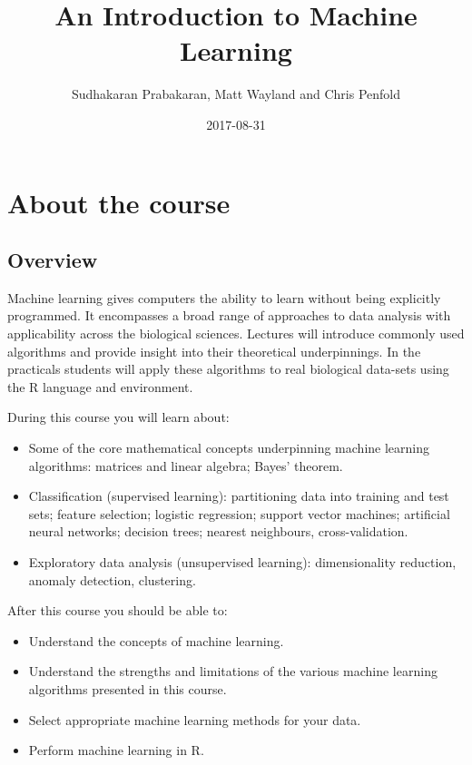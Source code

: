 \documentclass[]{book}
\title{An Introduction to Machine Learning}
\author{Sudhakaran Prabakaran, Matt Wayland and Chris Penfold}
\date{2017-08-31}
\providecommand{\tightlist}{%
  \setlength{\itemsep}{0pt}\setlength{\parskip}{0pt}}
\theoremstyle{definition}
\theoremstyle{definition}
\theoremstyle{definition}
\theoremstyle{remark}
\begin{document}
\maketitle

{
\setcounter{tocdepth}{1}
\tableofcontents
}
\chapter{About the course}\label{about-the-course}

\section{Overview}\label{overview}

Machine learning gives computers the ability to learn without being
explicitly programmed. It encompasses a broad range of approaches to
data analysis with applicability across the biological sciences.
Lectures will introduce commonly used algorithms and provide insight
into their theoretical underpinnings. In the practicals students will
apply these algorithms to real biological data-sets using the R language
and environment.

During this course you will learn about:

\begin{itemize}
\tightlist
\item
  Some of the core mathematical concepts underpinning machine learning
  algorithms: matrices and linear algebra; Bayes' theorem.
\item
  Classification (supervised learning): partitioning data into training
  and test sets; feature selection; logistic regression; support vector
  machines; artificial neural networks; decision trees; nearest
  neighbours, cross-validation.
\item
  Exploratory data analysis (unsupervised learning): dimensionality
  reduction, anomaly detection, clustering.
\end{itemize}

After this course you should be able to:

\begin{itemize}
\tightlist
\item
  Understand the concepts of machine learning.
\item
  Understand the strengths and limitations of the various machine
  learning algorithms presented in this course.
\item
  Select appropriate machine learning methods for your data.
\item
  Perform machine learning in R.
\end{itemize}
\end{document}
